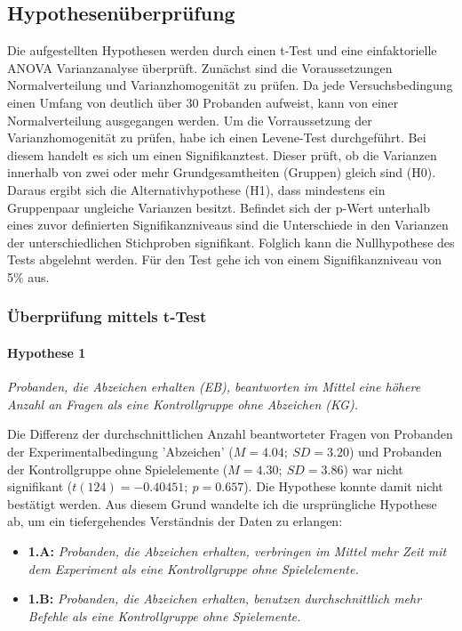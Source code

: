 \subsection{Hypothesenüberprüfung}
Die aufgestellten Hypothesen werden durch einen t-Test und eine einfaktorielle  ANOVA  Varianzanalyse überprüft. Zunächst sind die Voraussetzungen Normalverteilung und Varianzhomogenität zu prüfen. Da jede Versuchsbedingung einen Umfang von deutlich über 30 Probanden aufweist, kann von einer Normalverteilung ausgegangen werden. Um die Vorraussetzung der Varianzhomogenität zu prüfen, habe ich einen Levene-Test durchgeführt. Bei diesem handelt es sich um einen Signifikanztest. Dieser prüft, ob die Varianzen innerhalb von zwei oder mehr Grundgesamtheiten (Gruppen) gleich sind (H0). Daraus ergibt sich die Alternativhypothese (H1), dass mindestens ein Gruppenpaar ungleiche Varianzen besitzt. Befindet sich der p-Wert unterhalb  eines zuvor definierten Signifikanzniveaus sind die Unterschiede in den Varianzen der unterschiedlichen Stichproben signifikant. Folglich kann die Nullhypothese des Tests abgelehnt werden. Für den Test gehe ich von einem Signifikanzniveau von 5\% aus. 

\subsubsection{Überprüfung mittels t-Test}

\paragraph{Hypothese 1 }
\begin{center}
    \textit{Probanden, die Abzeichen erhalten (EB), beantworten im Mittel eine höhere Anzahl an Fragen als eine Kontrollgruppe ohne Abzeichen (KG).} 
\end{center}

Die Differenz der durchschnittlichen Anzahl beantworteter Fragen von Probanden der Experimentalbedingung 'Abzeichen' ($M =4.04;\:SD=3.20$) und Probanden der Kontrollgruppe ohne Spielelemente ($M=4.30;\:SD=3.86$) war nicht signifikant ($t (124) = -0.40451;\: p = 0.657$). Die Hypothese konnte damit nicht bestätigt werden. Aus diesem Grund wandelte ich die ursprüngliche Hypothese ab, um ein tiefergehendes Verständnis der Daten zu erlangen: 

\begin{itemize}
    \item \textbf{1.A:} \textit{Probanden, die Abzeichen erhalten, verbringen im Mittel mehr Zeit mit dem Experiment als eine Kontrollgruppe ohne Spielelemente.}
    \item \textbf{1.B:} \textit{Probanden, die Abzeichen erhalten, benutzen durchschnittlich mehr Befehle als eine Kontrollgruppe ohne Spielemente.} 
\end{itemize}

